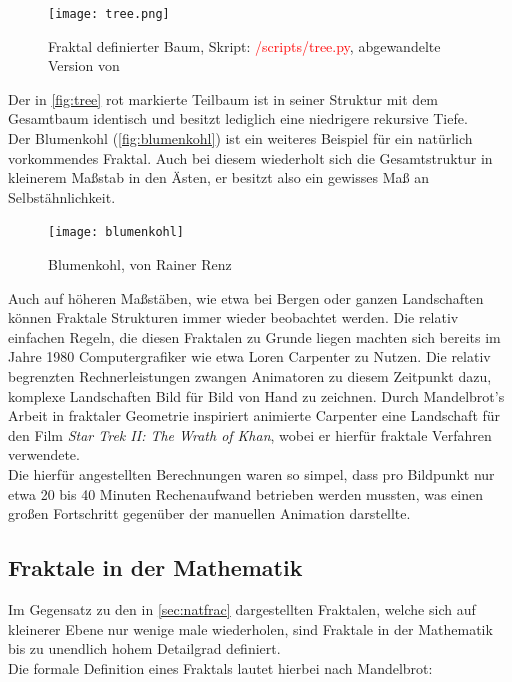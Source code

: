 \documentclass[a4paper,12pt,onesided]{report}
\begin{document}
\begin{figure}[H]
	\centering
	\texttt{[image: tree.png]}
	\caption{Fraktal definierter Baum, Skript: \textcolor{red}{/scripts/tree.py}, abgewandelte Version von \cite{soTree}}
	\label{fig:tree}
\end{figure}

Der in \autoref{fig:tree} rot markierte Teilbaum ist in seiner Struktur mit dem Gesamtbaum identisch und besitzt lediglich eine niedrigere rekursive Tiefe.\\
Der Blumenkohl (\autoref{fig:blumenkohl}) ist ein weiteres Beispiel für ein natürlich vorkommendes Fraktal. 
Auch bei diesem wiederholt sich die Gesamtstruktur in kleinerem Maßstab in den Ästen, er besitzt also ein gewisses Maß an Selbstähnlichkeit.

\begin{figure}[H]
	\centering
	\texttt{[image: blumenkohl]}
	\caption{Blumenkohl, von Rainer Renz}
	\label{fig:blumenkohl}
\end{figure}

Auch auf höheren Maßstäben, wie etwa bei Bergen oder ganzen Landschaften können Fraktale Strukturen immer wieder beobachtet werden. 
Die relativ einfachen Regeln, die diesen Fraktalen zu Grunde liegen machten sich bereits im Jahre 1980 Computergrafiker wie etwa Loren Carpenter zu Nutzen. Die relativ begrenzten Rechnerleistungen zwangen Animatoren zu diesem Zeitpunkt dazu, komplexe Landschaften Bild für Bild von Hand zu zeichnen. Durch Mandelbrot's Arbeit in fraktaler Geometrie inspiriert animierte Carpenter eine Landschaft für den Film \textit{Star Trek II: The Wrath of Khan}, wobei er hierfür fraktale Verfahren verwendete. \cite{startrekFractals}\\
Die hierfür angestellten Berechnungen waren so simpel, dass pro Bildpunkt nur etwa 20 bis 40 Minuten Rechenaufwand betrieben werden mussten, was einen großen Fortschritt gegenüber der manuellen Animation darstellte. \cite{carpenterVolLibre}\\

\subsection{Fraktale in der Mathematik}
Im Gegensatz zu den in \autoref{sec:natfrac} dargestellten Fraktalen, welche sich auf kleinerer Ebene nur wenige male wiederholen, sind Fraktale in der Mathematik bis zu unendlich hohem Detailgrad definiert.\\
Die formale Definition eines Fraktals lautet hierbei nach Mandelbrot:
\end{document}
